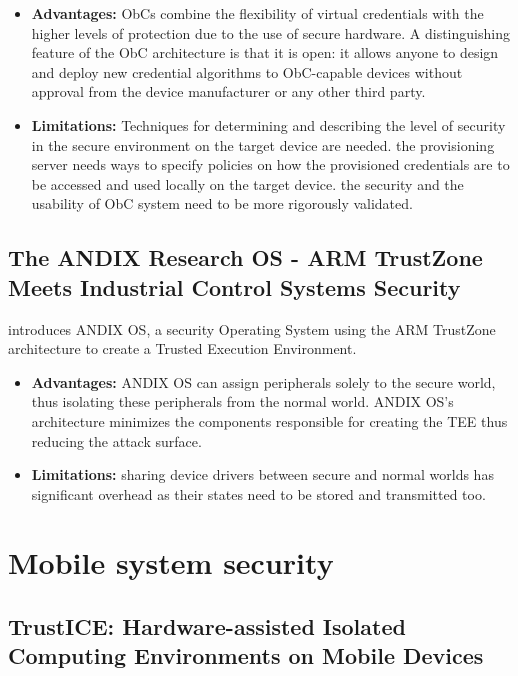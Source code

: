 \documentclass[conference]{IEEEtran}
\begin{document}
\begin{itemize}
    \item \textbf{Advantages:} ObCs combine the flexibility of virtual credentials with the higher levels of protection due to the use of secure hardware. A distinguishing feature of the ObC architecture is that it is open: it allows anyone to design and deploy new credential algorithms to ObC-capable devices without approval from the device manufacturer or any other third party.
    \item \textbf{Limitations:} Techniques for determining and describing the level of security in the secure environment on the target device are needed. the provisioning server needs ways to specify policies on how the provisioned credentials are to be accessed and used locally on the target device. the security and the usability of ObC system need to be more rigorously validated.
\end{itemize}


\subsection{The ANDIX Research OS - ARM TrustZone Meets Industrial Control Systems Security}
introduces ANDIX OS, a security Operating System using the ARM TrustZone architecture to create a Trusted Execution Environment.
\begin{itemize}
    \item \textbf{Advantages:} ANDIX OS can assign peripherals solely to the secure world, thus isolating these peripherals from the normal world. ANDIX OS’s architecture minimizes the components responsible for creating the TEE thus reducing the attack surface.
    \item \textbf{Limitations:} sharing device drivers between secure and normal worlds has significant overhead as their states need to be stored and transmitted too.
\end{itemize}

\section{Mobile system security}

\subsection{TrustICE: Hardware-assisted Isolated Computing Environments on Mobile Devices}
\end{document}
